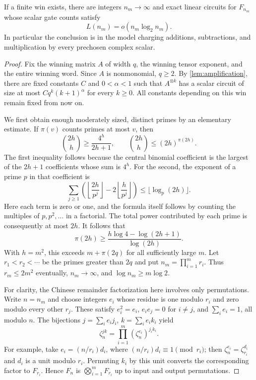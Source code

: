 \begin{proposition}\label{prop:win-to-fourier}
If a finite win exists, there are integers $n_m\to\infty$ and exact
linear circuits for $F_{n_m}$ whose scalar gate counts satisfy
\[
 L(n_m)=o(n_m\log_2n_m).
\]
In particular the conclusion is in the model charging additions,
subtractions, and multiplication by every prechosen complex scalar.
\end{proposition}

\begin{proof}
Fix the winning matrix $A$ of width $q$, the winning tensor exponent,
and the entire winning word.  Since $A$ is nonmonomial, $q\ge2$.
By \cref{lem:amplification}, there are fixed constants $C$ and
$0<\alpha<1$ such that $A^{\otimes k}$ has a scalar circuit of
size at most $Cq^k(k+1)^\alpha$ for every $k\ge0$.
All constants depending on this win remain fixed from now on.

We first obtain enough moderately sized, distinct primes by an
elementary estimate.  If $\pi(v)$ counts primes at most $v$, then
\[
 \binom{2h}{h}\ge\frac{4^h}{2h+1},\qquad
 \binom{2h}{h}\le(2h)^{\pi(2h)}.
\]
The first inequality follows because the central binomial coefficient
is the largest of the $2h+1$ coefficients whose sum is $4^h$.
For the second, the exponent of a prime $p$ in that coefficient is
\[
 \sum_{j\ge1}\left(
       \left\lfloor\frac{2h}{p^j}\right\rfloor
          -2\left\lfloor\frac{h}{p^j}\right\rfloor\right)
 \le\lfloor\log_p(2h)\rfloor.
\]
Here each term is zero or one, and the formula itself follows by
counting the multiples of $p,p^2,\ldots$ in a factorial.  The total
power contributed by each prime is consequently at most $2h$.
It follows that
\[
 \pi(2h)\ge
 \frac{h\log4-\log(2h+1)}{\log(2h)}.
\]
With $h=m^2$, this exceeds $m+\pi(2q)$ for all sufficiently large
$m$.  Let $r_1<r_2<\cdots$ be the primes greater than $2q$ and put
$n_m=\prod_{i=1}^m r_i$.  Thus $r_m\le2m^2$ eventually,
$n_m\to\infty$, and $\log n_m\ge m\log2$.

For clarity, the Chinese remainder factorization here involves only
permutations.  Write $n=n_m$ and choose integers $e_i$ whose residue
is one modulo $r_i$ and zero modulo every other $r_j$.  These satisfy
$e_i^2=e_i$, $e_ie_j=0$ for $i\ne j$, and $\sum_i e_i=1$, all
modulo $n$.  The bijections
$j=\sum_i e_i j_i$, $k=\sum_i e_i k_i$ yield
\[
 \zeta_n^{jk}=\prod_{i=1}^m(\zeta_n^{e_i})^{j_ik_i}.
\]
For example, take $e_i=(n/r_i)d_i$, where
$(n/r_i)d_i\equiv1\pmod {r_i}$; then
$\zeta_n^{e_i}=\zeta_{r_i}^{d_i}$ and $d_i$ is a unit modulo $r_i$.
Permuting $k_i$ by this unit converts the corresponding factor to
$F_{r_i}$.  Hence $F_n$ is $\bigotimes_{i=1}^mF_{r_i}$ up to input
and output permutations.


\end{proof}
